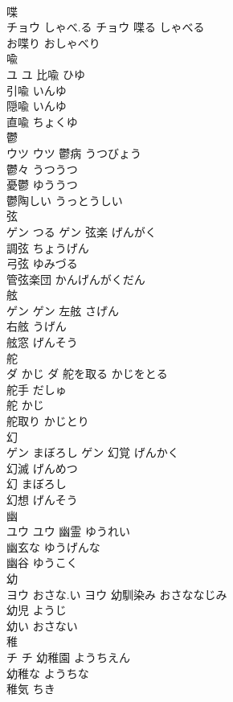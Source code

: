\documentclass[8pt]{extreport}
\begin{document}
\begin{CJK}{UTF8}{min}
\\	喋	
\\	チョウ	しゃべ.る	チョウ	喋る	しゃべる	
\\	お喋り	おしゃべり	
\\	喩	
\\	ユ		ユ	比喩	ひゆ	
\\	引喩	いんゆ	
\\	隠喩	いんゆ	
\\	直喩	ちょくゆ	
\\	鬱	
\\	ウツ		ウツ	鬱病	うつびょう	
\\	鬱々	うつうつ	
\\	憂鬱	ゆううつ	
\\	鬱陶しい	うっとうしい	
\\	弦	
\\	ゲン	つる	ゲン	弦楽	げんがく	
\\	調弦	ちょうげん	
\\	弓弦	ゆみづる	
\\	管弦楽団	かんげんがくだん	
\\	舷	
\\	ゲン		ゲン	左舷	さげん	
\\	右舷	うげん	
\\	舷窓	げんそう	
\\	舵	
\\	ダ	かじ	ダ	舵を取る	かじをとる	
\\	舵手	だしゅ	
\\	舵	かじ	
\\	舵取り	かじとり	
\\	幻	
\\	ゲン	まぼろし	ゲン	幻覚	げんかく	
\\	幻滅	げんめつ	
\\	幻	まぼろし	
\\	幻想	げんそう	
\\	幽	
\\	ユウ		ユウ	幽霊	ゆうれい	
\\	幽玄な	ゆうげんな	
\\	幽谷	ゆうこく	
\\	幼	
\\	ヨウ	おさな.い	ヨウ	幼馴染み	おさななじみ	
\\	幼児	ようじ	
\\	幼い	おさない	
\\	稚	
\\	チ		チ	幼稚園	ようちえん	
\\	幼稚な	ようちな	
\\	稚気	ちき	

\end{CJK}
\end{document}
